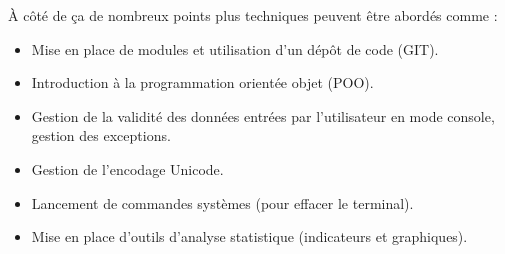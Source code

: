 À côté de ça de nombreux points plus techniques peuvent être abordés comme :
\begin{itemize}
\item Mise en place de modules et utilisation d'un dépôt de code (GIT).
\item Introduction à la programmation orientée objet (POO).
\item Gestion de la validité des données entrées par l'utilisateur en mode console, gestion des exceptions.
\item Gestion de l'encodage Unicode.
\item Lancement de commandes systèmes (pour effacer le terminal).
\item Mise en place d'outils d'analyse statistique (indicateurs et graphiques).

\end{itemize}

